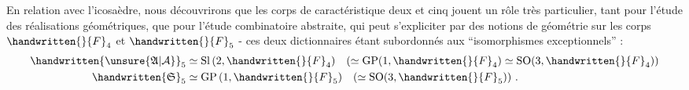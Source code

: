 En relation avec l'icosaèdre, nous découvrirons que les corps de caractéristique deux et cinq jouent un rôle très particulier, tant pour l'étude des réalisations géométriques, que pour l'étude combinatoire abstraite, qui peut s'expliciter par des notions de géométrie sur les corps ${\handwritten{\mathbb}{F}}_4$ et ${\handwritten{\mathbb}{F}}_5$ - ces deux dictionnaires étant subordonnés aux ``isomorphismes exceptionnels'' :
\[
 \begin{aligned}
 \handwritten{\unsure{\mathfrak A|\mathcal A}}_5 &\simeq \mathrm{Sl}\,(2,{\handwritten{\mathbb}{F}}_4)\quad(\simeq\mathrm{GP}(1,{\handwritten{\mathbb}{F}}_4)\simeq\mathrm{SO}(3,{\handwritten{\mathbb}{F}}_4))\\
 \handwritten{\mathfrak S}_5 &\simeq \mathrm{GP}\,(1,{\handwritten{\mathbb}{F}}_5)\quad(\simeq\mathrm{SO}(3,{\handwritten{\mathbb}{F}}_5))\ .
 \end{aligned}
\]
